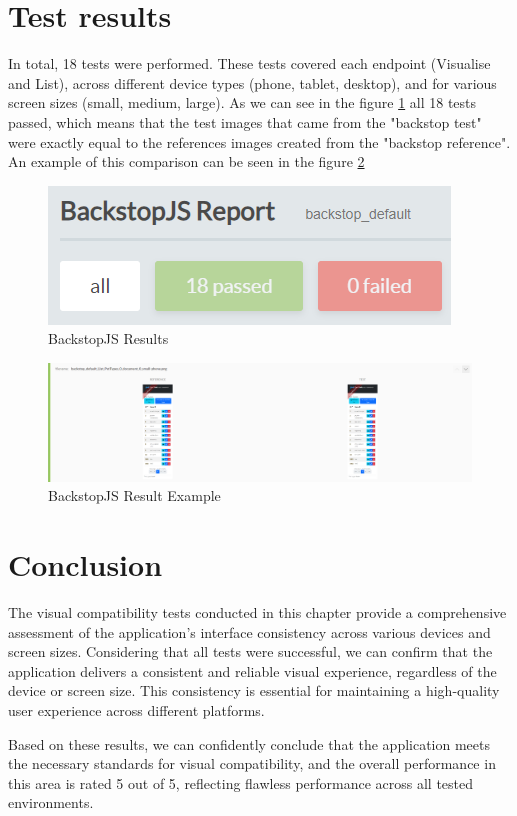 \documentclass[a4paper,11pt,openright,BCOR=15mm]{scrbook}
\begin{document}
\section{Test results}
In total, 18 tests were performed. These tests covered each endpoint (Visualise and List), across different device types (phone, tablet, desktop), and for various screen sizes (small, medium, large). As we can see in the figure \ref{fig:BackstopJS} all 18 tests passed, which means that the test images that came from the "backstop test" were exactly equal to the references images created from the "backstop reference". An example of this comparison can be seen in the figure \ref{fig:ResultExample}
\begin{figure}[H]
	\centering
	\includegraphics[width=.3\textwidth]{figs/Visual compatibility/BackstopJSReportResults.png}
	\caption{BackstopJS Results}
	\label{fig:BackstopJS}
\end{figure}
\begin{figure}[H]
	\centering
	\includegraphics[width=\textwidth]{figs/Visual compatibility/ResultExample.png}
	\caption{BackstopJS Result Example}
	\label{fig:ResultExample}
\end{figure}


\section{Conclusion}
The visual compatibility tests conducted in this chapter provide a comprehensive assessment of the application’s interface consistency across various devices and screen sizes. Considering that all tests were successful, we can confirm that the application delivers a consistent and reliable visual experience, regardless of the device or screen size. This consistency is essential for maintaining a high-quality user experience across different platforms.


Based on these results, we can confidently conclude that the application meets the necessary standards for visual compatibility, and the overall performance in this area is rated 5 out of 5, reflecting flawless performance across all tested environments.
\end{document}
